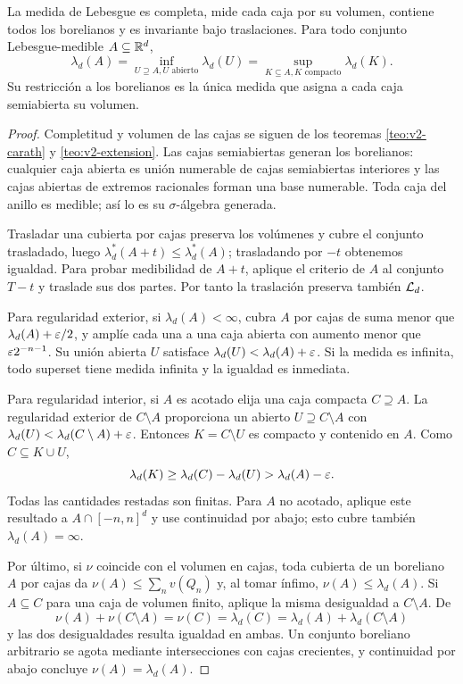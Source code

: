 \begin{teorema}\label{teo:v2-lebesgue-prop}
La medida de Lebesgue es completa, mide cada caja por su volumen, contiene todos los borelianos y es invariante bajo traslaciones. Para todo conjunto Lebesgue-medible $A\subseteq\mathbb R^d$,
\[\lambda_d(A)=\inf_{U\supseteq A, U\text{ abierto}}\lambda_d(U)
=\sup_{K\subseteq A, K\text{ compacto}}\lambda_d(K).\]
Su restricción a los borelianos es la única medida que asigna a cada caja semiabierta su volumen.
\end{teorema}
\begin{proof}
Completitud y volumen de las cajas se siguen de los teoremas \ref{teo:v2-carath} y \ref{teo:v2-extension}. Las cajas semiabiertas generan los borelianos: cualquier caja abierta es unión numerable de cajas semiabiertas interiores y las cajas abiertas de extremos racionales forman una base numerable. Toda caja del anillo es medible; así lo es su $\sigma$-álgebra generada.

Trasladar una cubierta por cajas preserva los volúmenes y cubre el conjunto trasladado, luego $\lambda_d^*(A+t)\le\lambda_d^*(A)$; trasladando por $-t$ obtenemos igualdad. Para probar medibilidad de $A+t$, aplique el criterio de $A$ al conjunto $T-t$ y traslade sus dos partes. Por tanto la traslación preserva también $\mathcal L_d$.

Para regularidad exterior, si $\lambda_d(A)<\infty$, cubra $A$ por cajas de suma menor que $\lambda_d(A)+\varepsilon/2$, y amplíe cada una a una caja abierta con aumento menor que $\varepsilon2^{-n-1}$. Su unión abierta $U$ satisface $\lambda_d(U)<\lambda_d(A)+\varepsilon$. Si la medida es infinita, todo superset tiene medida infinita y la igualdad es inmediata.

Para regularidad interior, si $A$ es acotado elija una caja compacta $C\supseteq A$. La regularidad exterior de $C\setminus A$ proporciona un abierto $U\supseteq C\setminus A$ con $\lambda_d(U)<\lambda_d(C\setminus A)+\varepsilon$. Entonces $K=C\setminus U$ es compacto y contenido en $A$. Como $C\subseteq K\cup U$,
\[\lambda_d(K)\ge\lambda_d(C)-\lambda_d(U)>\lambda_d(A)-\varepsilon.\]
Todas las cantidades restadas son finitas. Para $A$ no acotado, aplique este resultado a $A\cap[-n,n]^d$ y use continuidad por abajo; esto cubre también $\lambda_d(A)=\infty$.

Por último, si $\nu$ coincide con el volumen en cajas, toda cubierta de un boreliano $A$ por cajas da $\nu(A)\le\sum_nv(Q_n)$ y, al tomar ínfimo, $\nu(A)\le\lambda_d(A)$. Si $A\subseteq C$ para una caja de volumen finito, aplique la misma desigualdad a $C\setminus A$. De
\[\nu(A)+\nu(C\setminus A)=\nu(C)=\lambda_d(C)=\lambda_d(A)+\lambda_d(C\setminus A)\]
y las dos desigualdades resulta igualdad en ambas. Un conjunto boreliano arbitrario se agota mediante intersecciones con cajas crecientes, y continuidad por abajo concluye $\nu(A)=\lambda_d(A)$.
\end{proof}
